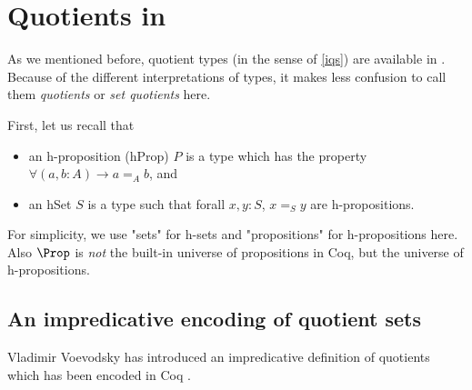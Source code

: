 







\section{Quotients in \hott}\label{qthott}

As we mentioned before, quotient types (in the sense of \ref{iqs}) are available in \hott. Because of the different interpretations of types, it makes less confusion to call them \emph{quotients} or \emph{set quotients} here.

First, let us recall that

\begin{itemize}
\item an h-proposition (hProp) $P$ is a type which has the property $\forall(a, b : A) \to a =_{A} b$, and

\item an hSet $S$ is a type such that forall $x, y : S$, $x =_{S} y$ are h-propositions.
\end{itemize}

For simplicity, we use "sets" for h-sets and "propositions" for h-propositions here. Also $\Prop$ is \emph{not} the built-in universe of propositions in Coq, but the universe of h-propositions.

\subsection{An impredicative encoding of quotient sets}\label{impredicative}

Vladimir Voevodsky has introduced an impredicative definition of quotients which has been encoded in Coq \cite{voe:hset}. 




